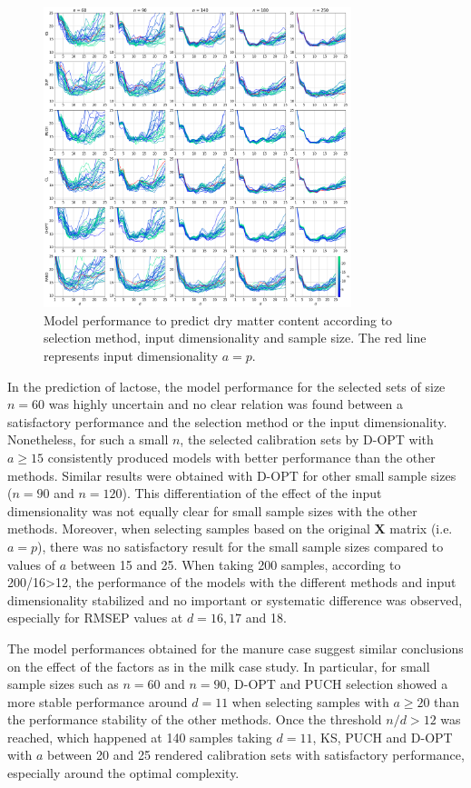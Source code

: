\documentclass[journal=ancham,manuscript=article]{achemso}
\begin{document}
\begin{figure}[H]
\includegraphics[width=0.8\textwidth]{manuscript/figures/d02_manure_model_performance.png}
\centering
\caption{Model performance to predict dry matter content according to selection method, input dimensionality and sample size. The red line represents input dimensionality $a=p$.}
\label{fig_d02_manure_model_performance}
\end{figure}


In the prediction of lactose, the model performance for the selected sets of size $n=60$ was highly uncertain and no clear relation was found between a satisfactory performance and the selection method or the input dimensionality. Nonetheless, for such a small $n$, the selected calibration sets by D-OPT with $a \ge 15$ consistently produced models with better performance than the other methods. Similar results were obtained with D-OPT for other small sample sizes ($n=90$ and $n=120$). This differentiation of the effect of the input dimensionality was not equally clear for small sample sizes with the other methods. Moreover, when selecting samples based on the original $\mathbf{X}$ matrix (i.e. $a=p$), there was no satisfactory result for the small sample sizes compared to values of $a$ between 15 and 25. When taking 200 samples, according to 200/16>12, the performance of the models with the different methods and input dimensionality stabilized and no important or systematic difference was observed, especially for RMSEP values at $d=16, 17$ and 18.

The model performances obtained for the manure case suggest similar conclusions on the effect of the factors as in the milk case study. In particular, for small sample sizes such as $n=60$ and $n=90$, D-OPT and PUCH selection showed a more stable performance around $d = 11$ when selecting samples with $a \ge 20$ than the performance stability of the other methods. Once the threshold $n/d>12$ was reached, which happened at 140 samples taking $d=11$, KS, PUCH and D-OPT with $a$ between 20 and 25 rendered calibration sets with satisfactory performance, especially around the optimal complexity. 
\end{document}
